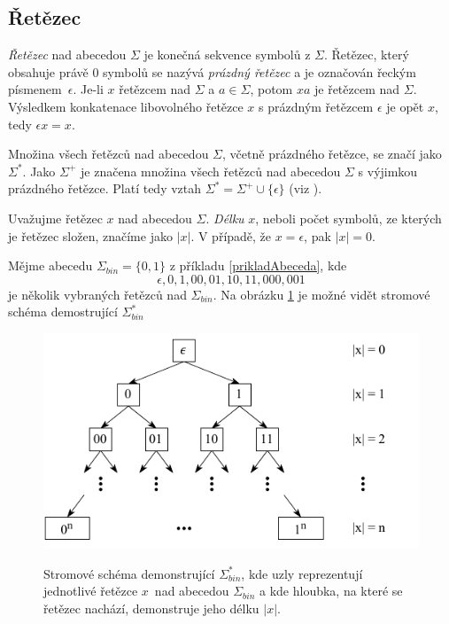 \subsection*{Řetězec}
\begin{definice}
  \emph{Řetězec} nad abecedou $\Sigma$ je konečná sekvence symbolů z $\Sigma$.
  Řetězec, který obsahuje právě $0$ symbolů se nazývá \emph{prázdný řetězec} a je označován řeckým písmenem~$\epsilon$.
  Je-li $x$ řetězcem nad $\Sigma$ a $a \in \Sigma$, potom $xa$ je řetězcem nad $\Sigma$.
  Výsledkem konkatenace libovolného řetězce $x$ s prázdným řetězcem $\epsilon$ je opět $x$, tedy $\epsilon x = x$.
\end{definice}

Množina všech řetězců
nad abecedou $\Sigma$, včetně prázdného řetězce, se značí jako $\Sigma^*$. Jako $\Sigma^+$ je značena množina všech řetězců
nad abecedou $\Sigma$ s výjimkou prázdného řetězce. Platí tedy vztah $\Sigma^* = \Sigma^+ \cup \{\epsilon\}$ (viz \cite{Ceska:2020:TeoretickaInformatikaTIN}).

\begin{definice}
  Uvažujme řetězec $x$ nad abecedou $\Sigma$. \emph{Délku} $x$, neboli počet symbolů, ze kterých je řetězec složen, značíme jako $|x|$.
  V případě, že $x = \epsilon$, pak $|x| = 0$.
\end{definice}

\begin{priklad}
  Mějme abecedu $\Sigma_{bin} = \{0, 1\}$ z příkladu \ref{prikladAbeceda}, kde
  $$\epsilon, 0, 1, 00, 01, 10, 11, 000, 001$$
  je několik vybraných řetězců nad $\Sigma_{bin}$. Na obrázku \ref{obrRetezec} je možné vidět stromové schéma demostrující $\Sigma_{bin}^*$


  \begin{figure}[h]\centering
    \centering
    \includegraphics[scale=1.1]{obrazky/RetezecPriklad.pdf}\\[1pt]

    \caption{Stromové schéma demonstrující $\Sigma_{bin}^*$, kde uzly reprezentují jednotlivé řetězce $x$~nad abecedou $\Sigma_{bin}$
    a kde hloubka, na které se řetězec nachází, demonstruje jeho délku $|x|$.}
    \label{obrRetezec}
  \end{figure}
\end{priklad}

